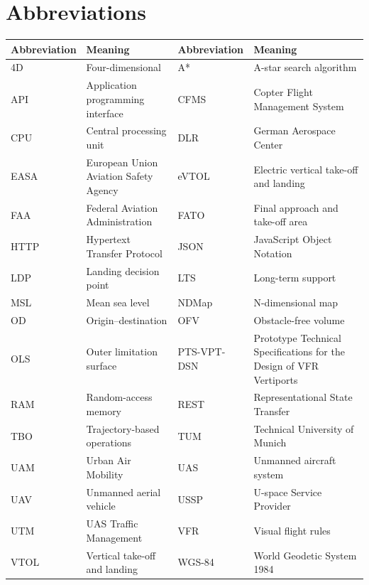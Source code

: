 \section*{Abbreviations}

\vspace{-0.6em}
\begingroup
\footnotesize
\renewcommand{\arraystretch}{0.88}
\begin{tabularx}{\textwidth}{lXlX}
    \toprule
    Abbreviation & Meaning & Abbreviation & Meaning \\
    \midrule
    4D & Four-dimensional & A* & A-star search algorithm \\
    API & Application programming interface & CFMS & Copter Flight Management System \\
    CPU & Central processing unit & DLR & German Aerospace Center \\
    EASA & European Union Aviation Safety Agency & eVTOL & Electric vertical take-off and landing \\
    FAA & Federal Aviation Administration & FATO & Final approach and take-off area \\
    HTTP & Hypertext Transfer Protocol & JSON & JavaScript Object Notation \\
    LDP & Landing decision point & LTS & Long-term support \\
    MSL & Mean sea level & NDMap & N-dimensional map \\
    OD & Origin--destination & OFV & Obstacle-free volume \\
    OLS & Outer limitation surface & PTS-VPT-DSN & Prototype Technical Specifications for the Design of VFR Vertiports \\
    RAM & Random-access memory & REST & Representational State Transfer \\
    TBO & Trajectory-based operations & TUM & Technical University of Munich \\
    UAM & Urban Air Mobility & UAS & Unmanned aircraft system \\
    UAV & Unmanned aerial vehicle & USSP & U-space Service Provider \\
    UTM & UAS Traffic Management & VFR & Visual flight rules \\
    VTOL & Vertical take-off and landing & WGS-84 & World Geodetic System 1984 \\
    \bottomrule
\end{tabularx}
\endgroup
